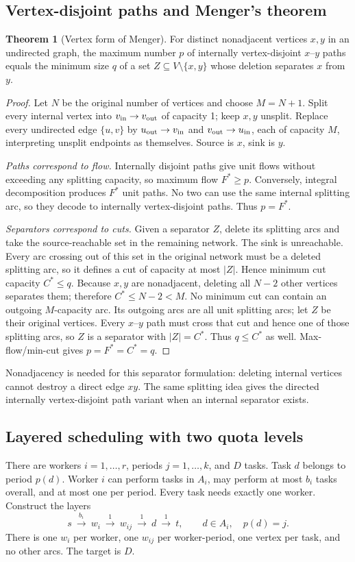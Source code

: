 \documentclass[10pt]{article}
\theoremstyle{definition}
\newtheorem{theorem}[definition]{Theorem}
\begin{document}
\subsection{Vertex-disjoint paths and Menger's theorem}\label{nf:menger}
\begin{theorem}[Vertex form of Menger]
For distinct nonadjacent vertices $x,y$ in an undirected graph, the maximum
number $p$ of internally vertex-disjoint $x$--$y$ paths equals the minimum
size $q$ of a set $Z\subseteq V\setminus\{x,y\}$ whose deletion separates
$x$ from $y$.
\end{theorem}
\begin{proof}
Let $N$ be the original number of vertices and choose $M=N+1$.
Split every internal vertex into $v_{\rm in}\to v_{\rm out}$ of capacity 1;
keep $x,y$ unsplit. Replace every undirected edge $\{u,v\}$ by
$u_{\rm out}\to v_{\rm in}$ and $v_{\rm out}\to u_{\rm in}$, each of capacity
$M$, interpreting unsplit endpoints as themselves. Source is $x$, sink is $y$.

\emph{Paths correspond to flow.} Internally disjoint paths give unit flows
without exceeding any splitting capacity, so maximum flow $F^*\ge p$.
Conversely, integral decomposition produces $F^*$ unit paths. No two can use
the same internal splitting arc, so they decode to internally vertex-disjoint
paths. Thus $p=F^*$.

\emph{Separators correspond to cuts.} Given a separator $Z$, delete its
splitting arcs and take the source-reachable set in the remaining network.
The sink is unreachable. Every arc crossing out of this set in the original
network must be a deleted splitting arc, so it defines a cut of capacity at
most $|Z|$. Hence minimum cut capacity $C^*\le q$.
Because $x,y$ are nonadjacent, deleting all $N-2$ other vertices separates
them; therefore $C^*\le N-2<M$. No minimum cut can contain an outgoing
$M$-capacity arc. Its outgoing arcs are all unit splitting arcs; let $Z$
be their original vertices. Every $x$--$y$ path must cross that cut and hence
one of those splitting arcs, so $Z$ is a separator with $|Z|=C^*$.
Thus $q\le C^*$ as well. Max-flow/min-cut gives $p=F^*=C^*=q$.
\end{proof}
Nonadjacency is needed for this separator formulation: deleting internal
vertices cannot destroy a direct edge $xy$. The same splitting idea gives
the directed internally vertex-disjoint path variant when an internal
separator exists.

\subsection{Layered scheduling with two quota levels}\label{nf:scheduling}
There are workers $i=1,\ldots,r$, periods $j=1,\ldots,k$, and $D$ tasks.
Task $d$ belongs to period $p(d)$. Worker $i$ can perform tasks in $A_i$,
may perform at most $b_i$ tasks overall, and at most one per period.
Every task needs exactly one worker. Construct the layers
\[
 s\ \xrightarrow{\ b_i\ }\ w_i
 \ \xrightarrow{\ 1\ }\ w_{ij}
 \ \xrightarrow{\ 1\ }\ d
 \ \xrightarrow{\ 1\ }\ t,
 \qquad d\in A_i,\quad p(d)=j.
\]
There is one $w_i$ per worker, one $w_{ij}$ per worker-period, one vertex per
task, and no other arcs. The target is $D$.
\end{document}
